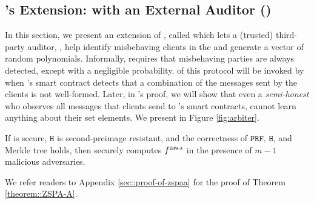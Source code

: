 



\vs




\subsection{\zspa's Extension: \zspa with an External Auditor (\zspaa)}


In this section, we present an extension of \zspa, called \zspaa which lets a (trusted) third-party auditor, \aud, help identify misbehaving clients in the \zspa and generate a vector of random polynomials. Informally, \zspaa requires that misbehaving parties are always detected, except with a negligible probability. \aud of this protocol will be invoked by \withFai when \withFai's smart contract detects that a combination of the messages sent by the clients is not well-formed. Later, in \withFai's proof, we will show that even a \emph{semi-honest} \aud who observes all messages that clients send to \withFai's smart contracts, cannot learn anything about their set elements. We present \zspaa in Figure \ref{fig:arbiter}. 


\vs







\begin{theorem}\label{theorem::ZSPA-A}
If \zspa is secure, $\mathtt{H}$ is second-preimage resistant, and the correctness of $\mathtt{PRF}$, $\mathtt{H}$, and Merkle tree holds,  then \zspaa securely computes $f^{\scriptscriptstyle \mathtt{ZSPA\text{-}A}}$ in the presence of $m-1 $ malicious adversaries.%
\end{theorem}

\svs

We refer readers to Appendix \ref{sec::proof-of-zspaa} for the proof of Theorem \ref{theorem::ZSPA-A}. 







